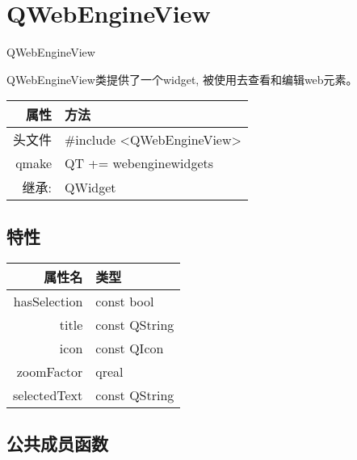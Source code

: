\chapter{QWebEngineView}

QWebEngineView 

QWebEngineView类提供了一个widget, 被使用去查看和编辑web元素。


\begin{tabular}{|r|l|}
	\hline
	属性 & 方法 \\
	\hline
	头文件 & \#include <QWebEngineView>\\      
	\hline
	qmake & QT += webenginewidgets\\      
	\hline
	继承: & QWidget\\
	\hline
\end{tabular}

\section{特性}

\begin{tabular}{|r|l|}
	\hline
	属性名 & 类型 \\
	\hline
	hasSelection&	const bool \\
	\hline
	title	&const QString\\
	\hline
	icon	&const QIcon\\
	\hline
	zoomFactor&	qreal\\
	\hline
	selectedText&	const QString\\
	\hline
\end{tabular}

\section{公共成员函数}

